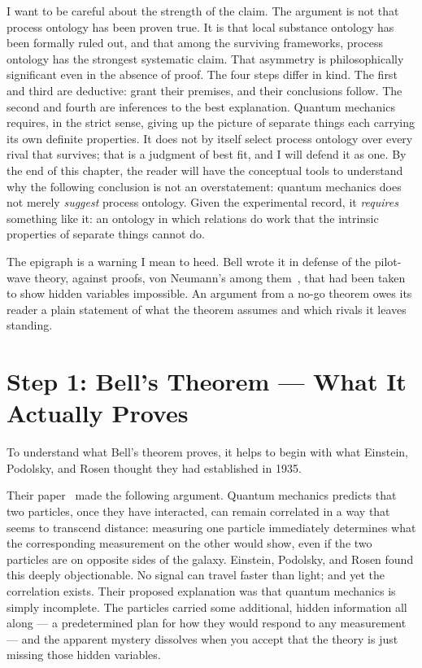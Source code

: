 I want to be careful about the strength of the claim.
The argument is not that process ontology has been proven true.
It is that local substance ontology has been formally ruled out, and that among
the surviving frameworks, process ontology has the strongest systematic claim.
That asymmetry is philosophically significant even in the absence of proof.
The four steps differ in kind.
The first and third are deductive: grant their premises, and their conclusions
follow.
The second and fourth are inferences to the best explanation.
Quantum mechanics requires, in the strict sense, giving up the picture of
separate things each carrying its own definite properties.
It does not by itself select process ontology over every rival that survives;
that is a judgment of best fit, and I will defend it as one.
By the end of this chapter, the reader will have the conceptual tools to understand
why the following conclusion is not an overstatement: quantum mechanics does not
merely \emph{suggest} process ontology.
Given the experimental record, it \emph{requires} something like it: an ontology
in which relations do work that the intrinsic properties of separate things
cannot do.

The epigraph is a warning I mean to heed.
Bell wrote it in defense of the pilot-wave theory, against proofs, von Neumann's
among them~\citep{vonNeumann1932}, that had been taken to show hidden variables
impossible.
An argument from a no-go theorem owes its reader a plain statement of what the
theorem assumes and which rivals it leaves standing.


\section{Step 1: Bell's Theorem --- What It Actually Proves}
\label{sec:ch5-step1}

To understand what Bell's theorem proves, it helps to begin with what Einstein,
Podolsky, and Rosen thought they had established in 1935.

Their paper~\citep{Einstein1935EPR} made the following argument.
Quantum mechanics predicts that two particles, once they have interacted,
can remain correlated in a way that seems to transcend distance: measuring one
particle immediately determines what the corresponding measurement on the other
would show, even if the two particles are on opposite sides of the galaxy.
Einstein, Podolsky, and Rosen found this deeply objectionable.
No signal can travel faster than light; and yet the correlation exists.
Their proposed explanation was that quantum mechanics is simply incomplete.
The particles carried some additional, hidden information all along --- a
predetermined plan for how they would respond to any measurement --- and the
apparent mystery dissolves when you accept that the theory is just missing those
hidden variables.

